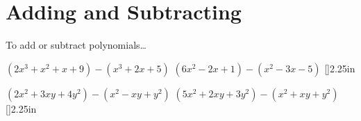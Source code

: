 \section{Adding and Subtracting}

\begin{myConceptSteps}{To add or subtract polynomials\dots}
\end{myConceptSteps}


\myProblems
    {
        $ (2x^3 + x^2 + x + 9) - (x^3 + 2x + 5) $
    }
    {
        $ (6x^2 - 2x + 1) - (x^2 - 3x - 5) $
    }
    [\normalsize]{2.25in}


\myProblems
    {
        $(2x^2 + 3xy + 4y^2)  -  (x^2 - xy + y^2)$
    }
    {
        $(5x^2 + 2xy + 3y^2)  -  (x^2 +xy + y^2 )$
    }
[\normalsize]{2.25in}
